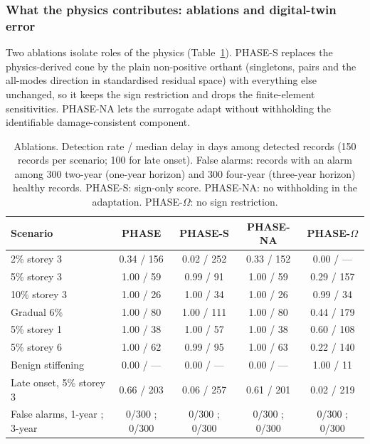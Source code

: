 \documentclass[12pt,a4paper]{article}
\newenvironment{revblock}{}{}
\newenvironment{revblock}{\begingroup\color{revcol}}{\endgroup}
\begin{document}
\begin{revblock}
\subsubsection{What the physics contributes: ablations and digital-twin error}\label{sec:res-ablate}

Two ablations isolate roles of the physics (Table~\ref{tab:ablation}). PHASE-S replaces the physics-derived cone by the plain non-positive orthant (singletons, pairs and the all-modes direction in standardised residual space) with everything else unchanged, so it keeps the sign restriction and drops the finite-element sensitivities. PHASE-NA lets the surrogate adapt without withholding the identifiable damage-consistent component.

\begin{table}[t]
\centering
\small
\caption{Ablations. Detection rate / median delay in days among detected records (150 records per scenario; 100 for late onset). False alarms: records with an alarm among 300 two-year (one-year horizon) and 300 four-year (three-year horizon) healthy records. PHASE-S: sign-only score. PHASE-NA: no withholding in the adaptation. PHASE-$\Omega$: no sign restriction.}
\label{tab:ablation}
\setlength{\tabcolsep}{4pt}
\begin{tabular}{lcccc}
\toprule
Scenario & PHASE & PHASE-S & PHASE-NA & PHASE-$\Omega$ \\
\midrule
2\% storey 3 & 0.34 / 156 & 0.02 / 252 & 0.33 / 152 & 0.00 / --- \\
5\% storey 3 & 1.00 / 59 & 0.99 / 91 & 1.00 / 59 & 0.29 / 157 \\
10\% storey 3 & 1.00 / 26 & 1.00 / 34 & 1.00 / 26 & 0.99 / 34 \\
Gradual 6\% & 1.00 / 80 & 1.00 / 111 & 1.00 / 80 & 0.44 / 179 \\
5\% storey 1 & 1.00 / 38 & 1.00 / 57 & 1.00 / 38 & 0.60 / 108 \\
5\% storey 6 & 1.00 / 62 & 0.99 / 95 & 1.00 / 63 & 0.22 / 140 \\
Benign stiffening & 0.00 / --- & 0.00 / --- & 0.00 / --- & 1.00 / 11 \\
Late onset, 5\% storey 3 & 0.66 / 203 & 0.06 / 257 & 0.61 / 201 & 0.02 / 219 \\
\midrule
False alarms, 1-year ; 3-year & 0/300 ; 0/300 & 0/300 ; 0/300 & 0/300 ; 0/300 & 0/300 ; 0/300 \\
\bottomrule
\end{tabular}
\end{table}


\end{revblock}
\end{document}

